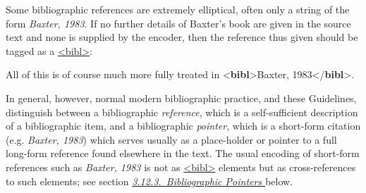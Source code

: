 Some bibliographic references are extremely elliptical, often only a string of the form \textit{Baxter, 1983}. If no further details of Baxter's book are given in the source text and none is supplied by the encoder, then the reference thus given should be tagged as a \hyperref[TEI.bibl]{<bibl>}: \par\bgroup{}\exampleFont \begin{shaded}\noindent\mbox{}All of this is of course much more fully treated\mbox{}\newline 
 in {<\textbf{bibl}>}Baxter, 1983{</\textbf{bibl}>}.\end{shaded}\egroup\par \noindent  In general, however, normal modern bibliographic practice, and these Guidelines, distinguish between a bibliographic \textit{reference}, which is a self-sufficient description of a bibliographic item, and a bibliographic \textit{pointer}, which is a short-form citation (e.g. \textit{Baxter, 1983}) which serves usually as a place-holder or pointer to a full long-form reference found elsewhere in the text. The usual encoding of short-form references such as \textit{Baxter, 1983} is not as \hyperref[TEI.bibl]{<bibl>} elements but as cross-references to such elements; see section \textit{\hyperref[COBIXR]{3.12.3.\ Bibliographic Pointers }} below.\par
